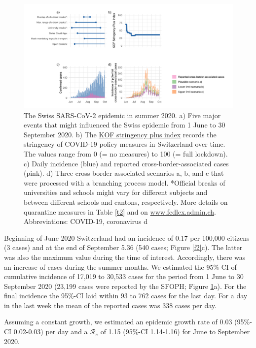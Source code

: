 \documentclass[10pt, a4paper, twoside]{article}
\begin{document}
\begin{multicols}{2}
\begin{figure}
\centering
\includegraphics[scale=0.15]{Figure1_2021-06-02.png}
\caption{The Swiss SARS-CoV-2 epidemic in summer 2020.
a) Five major events that might influenced the Swiss epidemic from 1 June to 30 September 2020.
b) The \href{https://kof.ethz.ch/en/forecasts-and-indicators/indicators/kof-stringency-index.html}{KOF stringency plus index} records the stringency of COVID-19 policy measures in Switzerland over time.
The values range from 0 (= no measures) to 100 (= full lockdown).
c) Daily incidence (blue) and reported cross-border-associated cases (pink).
d) Three cross-border-associated scenarios a, b, and c that were processed with a branching process model.
*Official breaks of universities and schools might vary for different subjects and between different schools and cantons, respectively.
More details on quarantine measures in Table \ref{t2} and on \href{https://www.fedlex.admin.ch/eli/cc/2021/61/de}{www.fedlex.admin.ch}.
Abbreviations: COVID-19, coronavirus d}
\label{f1}
\end{figure}

Beginning of June 2020 Switzerland had an incidence of 0.17 per 100,000 citizens (3 cases) and at the end of September 5.36 (540 cases; Figure \ref{f2}c).
The latter was also the maximum value during the time of interest.
Accordingly, there was an increase of cases during the summer months.
We estimated the 95\%-CI of cumulative incidence of 17,019 to 30,533 cases for the period from 1 June to 30 September 2020 (23,199 cases were reported by the SFOPH; Figure \ref{f1}a).
For the final incidence the 95\%-CI laid within 93 to 762 cases for the last day.
For a day in the last week the mean of the reported cases was 338 cases per day.

Assuming a constant growth, we estimated an epidemic growth rate of 0.03 (95\%-CI 0.02-0.03) per day and a $\mathcal{R}_e$ of 1.15 (95\%-CI 1.14-1.16) for June to September 2020.



\end{multicols}
\end{document}
